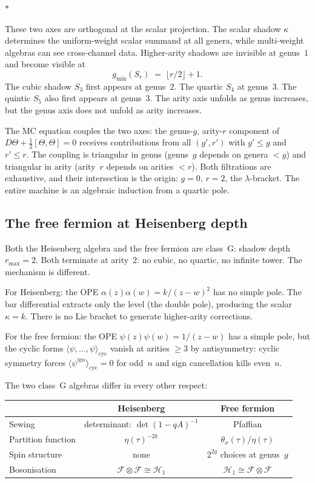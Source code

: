 \documentclass[11pt]{article}
\newcommand{\cH}{\mathcal{H}}
\newcommand{\cF}{\mathcal{F}}
\newcommand{\sep}{\bigskip\begin{center}$*$\end{center}\medskip}
\begin{document}
\sep

These two axes are orthogonal at the scalar projection.  The
scalar shadow $\kappa$ determines the uniform-weight scalar
summand at all genera, while multi-weight algebras can see
cross-channel data.  Higher-arity shadows are invisible at
genus~$1$ and become visible at
\[
g_{\min}(S_r) \;=\; \lfloor r/2 \rfloor + 1.
\]
The cubic shadow $S_3$ first appears at genus~$2$.  The quartic
$S_4$ at genus~$3$.  The quintic $S_5$ also first appears at
genus~$3$.  The arity
axis unfolds as genus increases, but the genus axis does not
unfold as arity increases.

The MC equation couples the two axes: the genus-$g$, arity-$r$
component of $D\Theta + \tfrac{1}{2}[\Theta, \Theta] = 0$
receives contributions from all $(g', r')$ with $g' \leq g$
and $r' \leq r$.  The coupling is triangular in genus (genus~$g$
depends on genera $< g$) and triangular in arity (arity~$r$
depends on arities $< r$).  Both filtrations are exhaustive, and
their intersection is the origin: $g = 0$, $r = 2$, the
$\lambda$-bracket.  The entire machine is an algebraic induction
from a quartic pole.


\subsection{The free fermion at Heisenberg depth}
\label{sec:free-fermion-heisenberg}

Both the Heisenberg algebra and the free fermion are class~G:
shadow depth $r_{\max} = 2$.  Both terminate at arity~$2$: no
cubic, no quartic, no infinite tower.  The mechanism is
different.

For Heisenberg: the OPE $\alpha(z)\alpha(w) = k/(z-w)^2$ has no
simple pole.  The bar differential extracts only the level (the
double pole), producing the scalar $\kappa = k$.  There is no
Lie bracket to generate higher-arity corrections.

For the free fermion: the OPE $\psi(z)\psi(w) = 1/(z-w)$ has a
simple pole, but the cyclic forms
$\langle \psi, \ldots, \psi \rangle_{\mathrm{cyc}}$ vanish at
arities $\geq 3$ by antisymmetry: cyclic symmetry forces
$\langle \psi^{\otimes n} \rangle_{\mathrm{cyc}} = 0$ for odd~$n$
and sign cancellation kills even~$n$.

The two class~G algebras differ in every other respect:
\begin{center}
\small
\renewcommand{\arraystretch}{1.15}
\begin{tabular}{@{}lcc@{}}
& \textbf{Heisenberg} & \textbf{Free fermion} \\
\hline
Sewing & determinant: $\det(1 - qA)^{-1}$ & Pfaffian \\
Partition function & $\eta(\tau)^{-2k}$ &
  $\theta_\sigma(\tau)/\eta(\tau)$ \\
Spin structure & none & $2^{2g}$ choices at genus~$g$ \\
Bosonisation & $\cF \otimes \cF \cong \cH_1$ &
  $\cH_1 \cong \cF \otimes \cF$ \\
\end{tabular}
\end{center}
\end{document}
